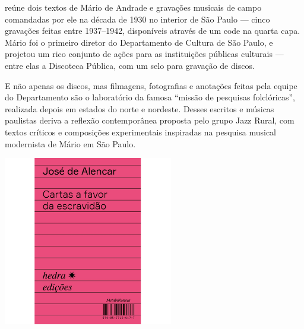 \hspace*{-7cm}\hrulefill\hspace*{-7cm}

\medskip

 reúne dois textos de Mário de Andrade e gravações musicais de campo comandadas por ele na década de 1930 no interior de São Paulo --- cinco gravações feitas entre 1937--1942, disponíveis através de um  code na quarta capa. Mário foi o primeiro diretor do Departamento de Cultura de São Paulo, e projetou um rico conjunto de ações para as instituições públicas culturais --- entre elas a Discoteca Pública, com um selo para gravação de discos.

E não apenas os discos, mas filmagens, fotografias e anotações feitas pela equipe do Departamento são o laboratório da famosa “missão de pesquisas folclóricas”, realizada depois em estados do norte e nordeste. Desses escritos e músicas paulistas deriva a reflexão contemporânea proposta pelo grupo Jazz Rural, com textos críticos e composições experimentais inspiradas na pesquisa musical modernista de Mário em São Paulo.

\vfill

\hspace*{-.4cm}\begin{minipage}[c]{.5\linewidth}
\small{
{}}
\end{minipage}

\pagebreak


\begin{center}
\hspace*{.5cm}\includegraphics[width=74mm]{./grid/alencar.jpg}
\end{center}

